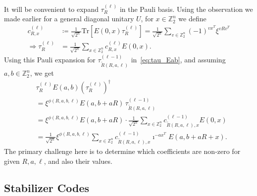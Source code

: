 \documentclass[twoside,romanappendices]{IEEEtran}
\begin{document}
It will be convenient to expand $\tau_R^{(\ell)}$ in the Pauli basis. 
Using the observation we made earlier for a general diagonal unitary $U$, for $x \in \mathbb{Z}_2^n$ we define 
\begin{align}
\label{eq:tau_coeff}
c_{R,x}^{(\ell)} & \coloneqq \frac{1}{\sqrt{2^n}} \text{Tr}\left[ E(0,x) \tau_R^{(\ell)} \right] = \frac{1}{\sqrt{2^n}} \sum_{v \in \mathbb{Z}_2^n} (-1)^{vx^T} \xi^{vRv^T} \nonumber \\
%
\Rightarrow \tau_R^{(\ell)} & = \frac{1}{\sqrt{2^n}} \sum_{x \in \mathbb{Z}_2^n} c_{R,x}^{(\ell)} E(0,x).
\end{align}
Using this Pauli expansion for $\tau_{\tilde{R}(R,a,\ell)}^{(\ell-1)}$ in~\eqref{eq:tau_Eab}, and assuming $a,b \in \mathbb{Z}_2^n$, we get
\begin{align}
& \tau_R^{(\ell)} E(a,b) ( \tau_R^{(\ell)} )^{\dagger} \nonumber \\
%
  & = \xi^{\phi(R,a,b,\ell)} E(a, b + a R) \, \tau_{\tilde{R}(R,a,\ell)}^{(\ell-1)} \\
%
  & = \xi^{\phi(R,a,b,\ell)} E(a, b + a R) \cdot \frac{1}{\sqrt{2^n}} \sum_{x \in \mathbb{Z}_2^n} c_{\tilde{R}(R,a,\ell),x}^{(\ell-1)} E(0,x) \\
%
\label{eq:tau_Eab_expand}
  & = \frac{1}{\sqrt{2^n}} \xi^{\phi(R,a,b,\ell)} \sum_{x \in \mathbb{Z}_2^n} c_{\tilde{R}(R,a,\ell),x}^{(\ell-1)} \imath^{-ax^T} E(a, b + aR + x).
\end{align}
The primary challenge here is to determine which coefficients are non-zero for given $R,a,\ell$, and also their values.


\subsection{Stabilizer Codes}
\label{sec:stabilizer_codes}
\end{document}
